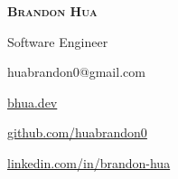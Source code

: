\documentclass{article}
\begin{document}
\hspace*{-1.5mm}
{\fontsize{40pt}{0pt}\selectfont {} \scshape \textbf{Brandon Hua}}

\vspace*{4.2mm}

\hspace*{-1mm}
{\ttfamily \large {} Software Engineer}

\vspace*{3mm}

\hspace*{-2.65mm}
{\ttfamily \footnotesize
\begin{itemize*}[label=$\diamond$]
	\item[] huabrandon0@gmail.com
	\item \href{https://www.bhua.dev/}{bhua.dev}
	\item \href{https://github.com/huabrandon0}{github.com/huabrandon0}
	\item \href{https://www.linkedin.com/in/brandon-hua/}{linkedin.com/in/brandon-hua}
\end{itemize*}
}

\vspace*{10mm}
\end{document}
